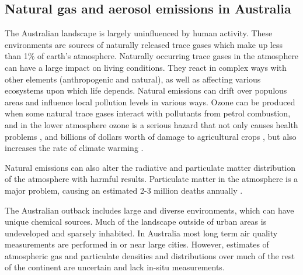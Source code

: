 \subsection{Natural gas and aerosol emissions in Australia}

The Australian landscape is largely uninfluenced by human activity.
These environments are sources of naturally released trace gases which make up less than 1\% of earth's atmosphere.
Naturally occurring trace gases in the atmosphere can have a large impact on living conditions.
They react in complex ways with other elements (anthropogenic and natural), as well as affecting various ecosystems upon which life depends.
Natural emissions can drift over populous areas and influence local pollution levels in various ways.
Ozone can be produced when some natural trace gases interact with pollutants from petrol combustion, and in the lower atmosphere ozone is a serious hazard that not only causes health problems \cite{Hsieh_2013}, and billions of dollars worth of damage to agricultural crops \cite{Avnery_2011}, but also increases the rate of climate warming \cite{IPCC_2013_chap8}.

Natural emissions can also alter the radiative and particulate matter distribution of the atmosphere with harmful results.
Particulate matter in the atmosphere is a major problem, causing an estimated 2-3 million deaths annually \cite{Hoek_2013, 19627030, Silva_2013, Lelieveld_2015}.

The Australian outback includes large and diverse environments, which can have unique chemical sources.
Much of the landscape outside of urban areas is undeveloped and sparsely inhabited.
In Australia most long term air quality measurements are performed in or near large cities.
However, estimates of atmospheric gas and particulate densities and distributions over much of the rest of the continent are uncertain and lack in-situ measurements.
